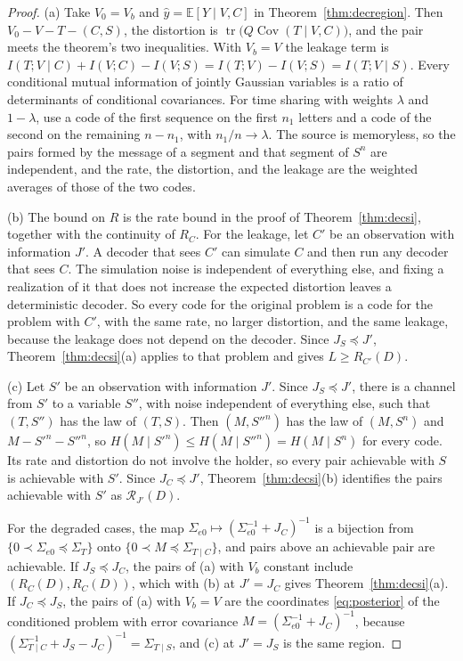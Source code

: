 \documentclass[11pt,onecolumn]{IEEEtran}
\newcommand{\E}{\mathbb{E}}
\newcommand{\tr}{\operatorname{tr}}
\newcommand{\Cov}{\operatorname{Cov}}
\newcommand{\RW}{\mathcal{R}}
\newcommand{\Sez}{\Sigma_{e0}}
\begin{document}
\begin{proof}
(a) Take $V_0=V_b$ and $\hat y=\E[Y\mid V,C]$ in
Theorem~\ref{thm:decregion}. Then $V_0-V-T-(C,S)$, the distortion is
$\tr\bigl(Q\Cov(T\mid V,C)\bigr)$, and the pair meets the theorem's two
inequalities. With $V_b=V$ the leakage term is
$I(T;V\mid C)+I(V;C)-I(V;S)=I(T;V)-I(V;S)=I(T;V\mid S)$. Every
conditional mutual information of jointly Gaussian variables is a ratio
of determinants of conditional covariances. For time sharing with weights $\lambda$ and
$1-\lambda$, use a code of the first sequence on the first $n_1$ letters
and a code of the second on the remaining $n-n_1$, with $n_1/n\to\lambda$.
The source is memoryless, so the pairs formed by the message of a
segment and that segment of $S^n$ are independent, and the rate, the
distortion, and the leakage are the weighted averages of those of the
two codes.

(b) The bound on $R$ is the rate bound in the proof of
Theorem~\ref{thm:decsi}, together with the continuity of $R_C$. For the
leakage, let $C'$ be an observation with information $J'$. A decoder that
sees $C'$ can simulate $C$ and then run any decoder that sees $C$. The
simulation noise is independent of everything else, and fixing a
realization of it that does not increase the expected distortion leaves
a deterministic decoder. So every code for the original problem is a code
for the problem with $C'$, with the same rate, no larger distortion, and
the same leakage, because the leakage does not depend on the decoder.
Since $J_S\preceq J'$, Theorem~\ref{thm:decsi}(a) applies to that problem
and gives $L\ge R_{C'}(D)$.

(c) Let $S'$ be an observation with information $J'$. Since
$J_S\preceq J'$, there is a channel from $S'$ to a variable $S''$, with
noise independent of everything else, such that $(T,S'')$ has the law of
$(T,S)$. Then $(M,S''^n)$ has the law of $(M,S^n)$ and $M-S'^n-S''^n$, so
$H(M\mid S'^n)\le H(M\mid S''^n)=H(M\mid S^n)$ for every code. Its rate and
distortion do not involve the holder, so every pair achievable with $S$
is achievable with $S'$. Since $J_C\preceq J'$, Theorem~\ref{thm:decsi}(b)
identifies the pairs achievable with $S'$ as $\RW_{J'}(D)$.

For the degraded cases, the map $\Sez\mapsto(\Sez^{-1}+J_C)^{-1}$ is a
bijection from $\{0\prec\Sez\preceq\Sigma_T\}$ onto
$\{0\prec M\preceq\Sigma_{T\mid C}\}$, and pairs above an achievable pair
are achievable. If $J_S\preceq J_C$, the pairs of (a) with $V_b$ constant
include $(R_C(D),R_C(D))$, which with (b) at $J'=J_C$ gives
Theorem~\ref{thm:decsi}(a). If $J_C\preceq J_S$, the pairs of (a) with
$V_b=V$ are the coordinates \eqref{eq:posterior} of the conditioned
problem with error covariance $M=(\Sez^{-1}+J_C)^{-1}$, because
$(\Sigma_{T\mid C}^{-1}+J_S-J_C)^{-1}=\Sigma_{T\mid S}$, and (c) at $J'=J_S$
is the same region.
\end{proof}
\end{document}
